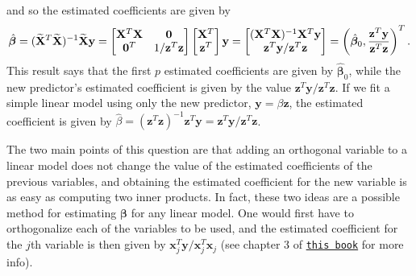 \documentclass[10pt]{article}
\begin{document}
and so the estimated coefficients are given by 
\begin{align}
    \hat{\bm{\beta}}
    = (\widetilde{\mathbf{X}}^T\widetilde{\mathbf{X}})^{-1}\widetilde{\mathbf{X}}\mathbf{y}
    = \begin{bmatrix}
        \mathbf{X}^T\mathbf{X} & \mathbf{0} \\
        \mathbf{0}^T & 1 / \mathbf{z}^T\mathbf{z}
    \end{bmatrix}
    \begin{bmatrix}
        \mathbf{X}^T \\ \mathbf{z}^T
    \end{bmatrix}
    \mathbf{y}
    = \begin{bmatrix}
        (\mathbf{X}^T\mathbf{X})^{-1}\mathbf{X}^T\mathbf{y} \\
        \mathbf{z}^T\mathbf{y} / \mathbf{z}^T\mathbf{z}
    \end{bmatrix}
    = \left( \hat{\bm{\beta}}_0, \frac{\mathbf{z}^T\mathbf{y}}{\mathbf{z}^T\mathbf{z}} \right)^T.
\end{align}
This result says that the first \(p\) estimated coefficients are given by \(\hat{\bm{\beta}}_0\), while the new predictor's estimated coefficient is 
given by the value \(\mathbf{z}^T\mathbf{y} / \mathbf{z}^T\mathbf{z}\). If we fit a simple linear model using only the new predictor, 
\(\mathbf{y} = \beta \mathbf{z}\), the estimated coefficient is given by 
\(\hat{\beta} = (\mathbf{z}^T\mathbf{z})^{-1}\mathbf{z}^T\mathbf{y} = \mathbf{z}^T\mathbf{y} / \mathbf{z}^T\mathbf{z}\).

The two main points of this question are that adding an orthogonal variable to a linear model does not change the value of the estimated coefficients 
of the previous variables, and obtaining the estimated coefficient for the new variable is as easy as computing two inner products. 
In fact, these two ideas are a possible method for estimating \(\bm{\beta}\) for any linear model. One would first have to orthogonalize each of the 
variables to be used, and the estimated coefficient for the \(j\)th variable is then given by \(\mathbf{x}_j^T\mathbf{y} / \mathbf{x}_j^T\mathbf{x}_j\)
(see chapter 3 of \href{https://web.stanford.edu/~hastie/ElemStatLearn/}{\texttt{this book}} for more info).

\end{document}
